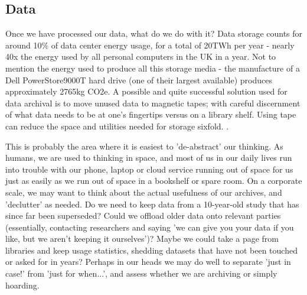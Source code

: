 \documentclass{article}
\begin{document}
\subsection{Data}
Once we have processed our data, what do we do with it? Data storage counts for around 10\% of data center energy usage, for a total of 20TWh per year \citep{shehabi2016united} - nearly 40x the energy used by all personal computers in the UK in a year.  \citep{waters2019energy} Not to mention the energy used to produce all this storage media - the manufacture of a Dell PowerStore9000T hard drive (one of their largest available) produces approximately 2765kg CO2e. \citep{dell2021powerstore} A possible and quite successful solution used for data archival is to move unused data to magnetic tapes; with careful discernment of what data needs to be at one's fingertips versus on a library shelf. Using tape can reduce the space and utilities needed for storage sixfold. \citep{moore2007disk}. \newline

This is probably the area where it is easiest to 'de-abstract' our thinking. As humans, we are used to thinking in space, and most of us in our daily lives run into trouble with our phone, laptop or cloud service running out of space for us just as easily as we run out of space in a bookshelf or spare room. On a corporate scale, we may want to think about the actual usefulness of our archives, and 'declutter' as needed. Do we need to keep data from a 10-year-old study that has since far been superseded? Could we offload older data onto relevant parties (essentially, contacting researchers and saying 'we can give you your data if you like, but we aren't keeping it ourselves')? Maybe we could take a page from libraries and keep usage statistics, shedding datasets that have not been touched or asked for in years? Perhaps in our heads we may do well to separate 'just in case!' from 'just for when...', and assess whether we are archiving or simply hoarding.
\end{document}
